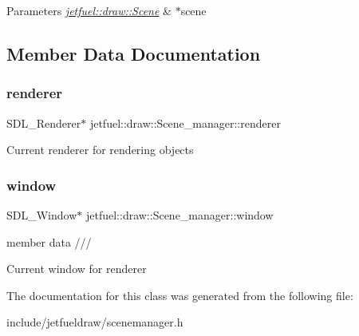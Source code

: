 \begin{DoxyParams}{Parameters}
{\em \hyperlink{classjetfuel_1_1draw_1_1Scene}{jetfuel\+::draw\+::\+Scene}} & $\ast$scene \\
\hline
\end{DoxyParams}


\subsection{Member Data Documentation}
\mbox{\label{classjetfuel_1_1draw_1_1Scene__manager_a34a22a19dd956074c9101f25414e3e1c}} 
\subsubsection{\texorpdfstring{renderer}{renderer}}
{\footnotesize\ttfamily S\+D\+L\+\_\+\+Renderer$\ast$ jetfuel\+::draw\+::\+Scene\+\_\+manager\+::renderer\hspace{0.3cm}{\ttfamily [protected]}}

Current renderer for rendering objects \mbox{\label{classjetfuel_1_1draw_1_1Scene__manager_a7613c251e515e82f62b87126a92b33b4}} 
\subsubsection{\texorpdfstring{window}{window}}
{\footnotesize\ttfamily S\+D\+L\+\_\+\+Window$\ast$ jetfuel\+::draw\+::\+Scene\+\_\+manager\+::window\hspace{0.3cm}{\ttfamily [protected]}}



member data /// 

Current window for renderer 

The documentation for this class was generated from the following file\+:\begin{DoxyCompactItemize}
\item 
include/jetfueldraw/scenemanager.\+h\end{DoxyCompactItemize}
